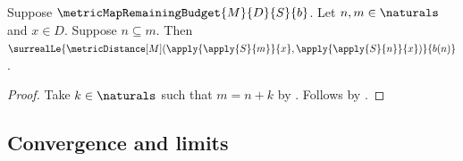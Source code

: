 \begin{corollary}\label{metric_map_tail_bound}
    Suppose $\metricMapRemainingBudget{M}{D}{S}{b}$.
    Let $n,m\in\naturals$ and $x\in D$.
    Suppose $n\subseteq m$.
    Then
        $\surrealLe{
            \metricDistance[M]
                (\apply{\apply{S}{m}}{x},
                 \apply{\apply{S}{n}}{x})}
            {b(n)}$.
\end{corollary}
\begin{proof}
    Take $k\in\naturals$ such that $m=n+k$
        by .
    Follows by .
\end{proof}

\subsection{Convergence and limits}

